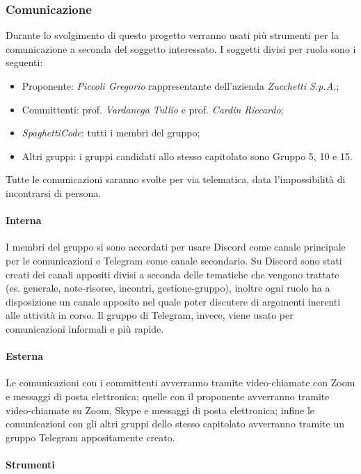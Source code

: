 \subsubsection{Comunicazione}
Durante lo svolgimento di questo progetto verranno usati più strumenti per la comunicazione a seconda del soggetto
interessato. I soggetti divisi per ruolo sono i seguenti:
\begin{itemize}
    \item Proponente: \emph{Piccoli Gregorio} rappresentante dell'azienda \emph{Zucchetti S.p.A.};
    \item Committenti: prof. \emph{Vardanega Tullio} e prof. \emph{Cardin Riccardo};
    \item \emph{SpaghettiCode}: tutti i membri del gruppo;
    \item Altri gruppi: i gruppi candidati allo stesso capitolato sono Gruppo 5, 10 e 15.
\end{itemize}
Tutte le comunicazioni saranno svolte per via telematica, data l'impossibilità di incontrarsi di persona.

\paragraph{Interna}

I membri del gruppo si sono accordati per usare Discord come canale principale per le comunicazioni e Telegram
come canale secondario. Su Discord sono stati creati dei canali appositi divisi a seconda delle tematiche che
vengono trattate (es. generale, note-risorse, incontri, gestione-gruppo), inoltre ogni ruolo ha a disposizione
un canale apposito nel quale poter discutere di argomenti inerenti alle attività in corso. Il gruppo di
Telegram, invece, viene usato per comunicazioni informali e più rapide.

\paragraph{Esterna}

Le comunicazioni con i committenti avverranno tramite video-chiamate con Zoom e messaggi di posta elettronica;
quelle con il proponente avverranno tramite video-chiamate su Zoom, Skype e messaggi di posta elettronica; infine
le comunicazioni con gli altri gruppi dello stesso capitolato avverranno tramite un gruppo Telegram appositamente
creato.

\paragraph{Strumenti}

